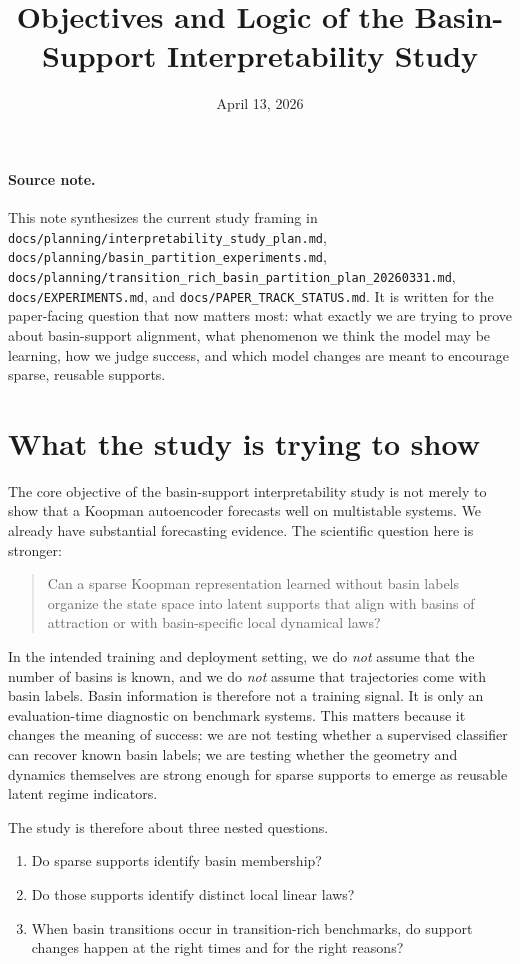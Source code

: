 \documentclass[11pt]{article}
\title{Objectives and Logic of the Basin-Support Interpretability Study}
\author{}
\date{April 13, 2026}
\begin{document}
\maketitle

\paragraph{Source note.}
This note synthesizes the current study framing in
\texttt{docs/planning/interpretability\_study\_plan.md},
\texttt{docs/planning/basin\_partition\_experiments.md},
\texttt{docs/planning/transition\_rich\_basin\_partition\_plan\_20260331.md},
\texttt{docs/EXPERIMENTS.md}, and \texttt{docs/PAPER\_TRACK\_STATUS.md}.
It is written for the paper-facing question that now matters most: what exactly
we are trying to prove about basin-support alignment, what phenomenon we think
the model may be learning, how we judge success, and which model changes are
meant to encourage sparse, reusable supports.

\section{What the study is trying to show}

The core objective of the basin-support interpretability study is not merely to
show that a Koopman autoencoder forecasts well on multistable systems. We
already have substantial forecasting evidence. The scientific question here is
stronger:
\begin{quote}
Can a sparse Koopman representation learned without basin labels organize the
state space into latent supports that align with basins of attraction or with
basin-specific local dynamical laws?
\end{quote}

In the intended training and deployment setting, we do \emph{not} assume that
the number of basins is known, and we do \emph{not} assume that trajectories
come with basin labels. Basin information is therefore not a training signal.
It is only an evaluation-time diagnostic on benchmark systems. This matters
because it changes the meaning of success: we are not testing whether a
supervised classifier can recover known basin labels; we are testing whether
the geometry and dynamics themselves are strong enough for sparse supports to
emerge as reusable latent regime indicators.

The study is therefore about three nested questions.
\begin{enumerate}[leftmargin=1.5em]
    \item Do sparse supports identify basin membership?
    \item Do those supports identify distinct local linear laws?
    \item When basin transitions occur in transition-rich benchmarks, do
    support changes happen at the right times and for the right reasons?
\end{enumerate}
\end{document}
